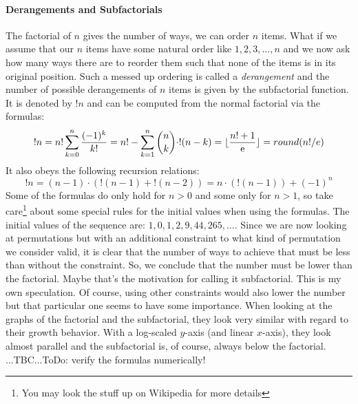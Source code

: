 \paragraph{Derangements and Subfactorials}
The factorial of $n$ gives the number of ways, we can order $n$ items. What if we assume that our $n$ items have some natural order like $1,2,3,\ldots,n$ and we now ask how many ways there are to reorder them such that none of the items is in its original position. Such a messed up ordering is called a \emph{derangement} and the number of possible derangements of $n$ items is given by the subfactorial function. It is denoted by $!n$ and can be computed from the normal factorial via the formulas: 
\begin{equation}
!n = n! \sum_{k=0}^{n} \frac{(-1)^k}{k!} 
   = n! - \sum_{k=1}^{n} \binom{n}{k} \cdot !(n-k)
   = \lfloor \frac{n! + 1}{\operatorname{\mathrm{e}}} \rfloor
   = round(n! / e)
\end{equation}
It also obeys the following recursion relations:
\begin{equation}
!n = (n-1) \cdot (!(n-1) + !(n-2))
   = n \cdot (!(n-1)) + (-1)^n
\end{equation}
Some of the formulas do only hold for $n > 0$ and some only for $n > 1$, so take care\footnote{You may look the stuff up on Wikipedia for more details} about some special rules for the initial values when using the formulas. The initial values of the sequence are: $1,0,1,2,9,44,265,\ldots$. Since we are now looking at permutations but with an additional constraint to what kind of permutation we consider valid, it is clear that the number of ways to achieve that must be less than without the constraint. So, we conclude that the number must be lower than the factorial. Maybe that's the motivation for calling it subfactorial. This is my own speculation. Of course, using other constraints would also lower the number but that particular one seems to have some importance. When looking at the graphs of the factorial and the subfactorial, they look very similar with regard to their growth behavior. With a log-scaled $y$-axis (and linear $x$-axis), they look almost parallel and the subfactorial is, of course, always below the factorial. ...TBC...ToDo: verify the formulas numerically!





